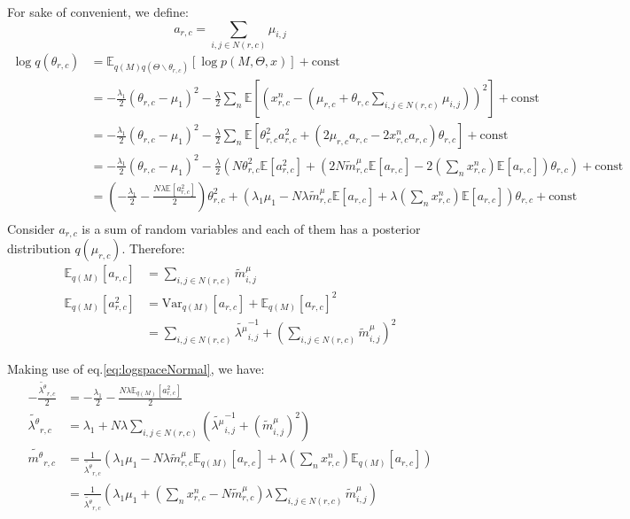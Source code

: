 \documentclass[12pt]{article}
\newenvironment{problem}[2][Problem]{\begin{trivlist}
\item[\hskip \labelsep {\bfseries #1}\hskip \labelsep {\bfseries #2.}]}{\end{trivlist}}
\begin{document}
\begin{problem}{2.9.25}
For sake of convenient, we define:
\begin{equation}
    a_{r,c} = \sum_{i,j \in N(r,c)}\mu_{i,j}
\end{equation}
\begin{align*}
    \log q(\theta_{r,c}) &= 
        \mathbb{E}_{q(M)q(\Theta\backslash\theta_{r,c})}[\log p(M, \Theta, x)] 
        + \text{const} \\
    &= -\frac{\lambda_1}{2}(\theta_{r,c} - \mu_1)^2
    -\frac{\lambda}{2}\sum_n\mathbb{E}[(x^n_{r,c} - (\mu_{r,c} + \theta_{r,c}\sum_{i,j \in N(r,c)}\mu_{i,j}))^2]
    + \text{const} \\
    &= -\frac{\lambda_1}{2}(\theta_{r,c} - \mu_1)^2
    -\frac{\lambda}{2}\sum_n\mathbb{E}[\theta^2_{r,c}a_{r,c}^2 + (2\mu_{r,c}a_{r,c} - 2x^n_{r,c}a_{r,c})\theta_{r,c}]
    + \text{const} \\
    &=-\frac{\lambda_1}{2}(\theta_{r,c} - \mu_1)^2  
    -\frac{\lambda}{2}(N\theta^2_{r,c}\mathbb{E}[a_{r,c}^2] 
            + (2N\tilde{m}^{\mu}_{r,c}\mathbb{E}[a_{r,c}] - 2(\sum_n x^n_{r,c})\mathbb{E}[a_{r,c}])\theta_{r,c})
    + \text{const} \\
    &= (-\frac{\lambda_1}{2} -\frac{N\lambda\mathbb{E}[a_{r,c}^2]}{2})\theta_{r,c}^2 
    + (\lambda_1\mu_1 - N\lambda\tilde{m}^{\mu}_{r,c}\mathbb{E}[a_{r,c}] 
        + \lambda (\sum_n x^n_{r,c})\mathbb{E}[a_{r,c}])\theta_{r,c}
    + \text{const} \\
\end{align*}
Consider $a_{r,c}$ is a sum of random variables and each of them has a posterior distribution $q(\mu_{r,c})$. 
Therefore:
\begin{align*}
    \mathbb{E}_{q(M)}[a_{r,c}] &= \sum_{i,j \in N(r,c)}\tilde{m}^{\mu}_{i,j} \\
    \mathbb{E}_{q(M)}[a_{r,c}^2] &= \mathrm{Var}_{q(M)}[a_{r,c}] + \mathbb{E}_{q(M)}[a_{r,c}]^2 \\
    &= \sum_{i,j \in N(r,c)}\tilde{\lambda^{\mu}}^{-1}_{i,j} + (\sum_{i,j \in N(r,c)}\tilde{m}^{\mu}_{i,j})^2
\end{align*}

Making use of eq.\eqref{eq:logspaceNormal}, we have:
\begin{align*}
    -\frac{\tilde{\lambda^{\theta}}_{r,c}}{2} 
    &= -\frac{\lambda_1}{2} -\frac{N\lambda\mathbb{E}_{q(M)}[a_{r,c}^2]}{2} \\
    \tilde{\lambda^{\theta}}_{r,c}
    &= \lambda_1 + N\lambda\sum_{i,j \in N(r,c)}(\tilde{\lambda^{\mu}}^{-1}_{i,j} + (\tilde{m}^{\mu}_{i,j})^2) \\
    \tilde{m^{\theta}}_{r,c} 
    &= \frac{1}{\tilde{\lambda^{\theta}}_{r,c}}
    (\lambda_1\mu_1 - N\lambda\tilde{m}^{\mu}_{r,c}\mathbb{E}_{q(M)}[a_{r,c}] 
    + \lambda (\sum_n x^n_{r,c})\mathbb{E}_{q(M)}[a_{r,c}]) \\
    &= \frac{1}{\tilde{\lambda^{\theta}}_{r,c}}
    (\lambda_1\mu_1 + (\sum_n x^n_{r,c} - N\tilde{m}^{\mu}_{r,c})\lambda\sum_{i,j \in N(r,c)}\tilde{m}^{\mu}_{i,j})
\end{align*}


\end{problem}
\end{document}
